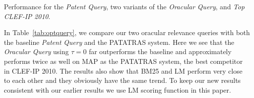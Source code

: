 %
%
%
%

\begin{table}[t!]
  \begin{center}
  \scriptsize
   \caption{Performance for the \textit{ Patent Query}, two variants of the \textit{ Oracular Query}, and \textit{ Top CLEF-IP 2010}.}
   \vspace*{1ex}
     
  \label{tab:optquery}
  \end{center}  
\end{table}

In Table~\ref{tab:optquery}, we compare our two oracular relevance
queries with both the baseline \textit{Patent Query} and the PATATRAS system.  Here we see that
the \emph{Oracular Query} using $\tau=0$ far outperforms the baseline and
approximately performs twice as well on MAP as the PATATRAS system, the best competitor in
CLEF-IP 2010. 
The results also show that BM25 and LM perform very close to each other and they obviously have the same trend. To keep our new results consistent with our earlier results we use LM scoring function in this paper.

